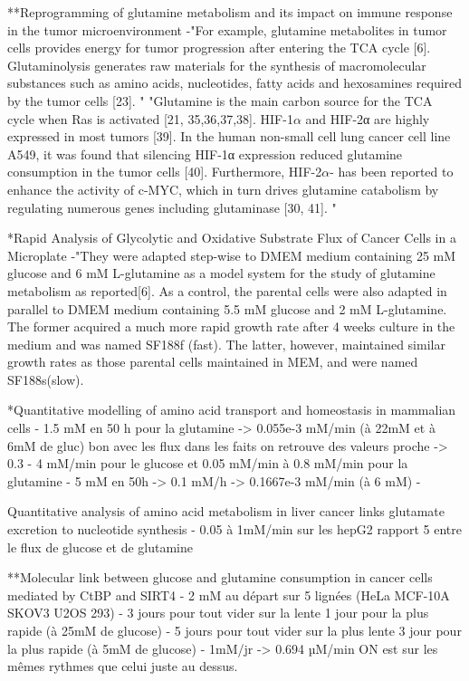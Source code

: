 \documentclass[11pt,a4paper]{article}
\begin{document}
**Reprogramming of glutamine metabolism and its impact on immune response in the tumor microenvironment
-"For example, glutamine metabolites in tumor cells provides energy for tumor progression after entering the TCA cycle [6]. Glutaminolysis generates raw materials for the synthesis of macromolecular substances such as amino acids, nucleotides, fatty acids and hexosamines required by the tumor cells [23]. "
"Glutamine is the main carbon source for the TCA cycle when Ras is activated [21, 35,36,37,38]. HIF-1$\alpha$ and HIF-2α are highly expressed in most tumors [39]. In the human non-small cell lung cancer cell line A549, it was found that silencing HIF-1α expression reduced glutamine consumption in the tumor cells [40]. Furthermore, HIF-2$\alpha$- has been reported to enhance the activity of c-MYC, which in turn drives glutamine catabolism by regulating numerous genes including glutaminase [30, 41]. "


*Rapid Analysis of Glycolytic and Oxidative Substrate Flux
of Cancer Cells in a Microplate
-"They were adapted step-wise to DMEM medium containing 25 mM glucose and 6 mM L-glutamine as a model system for the study of glutamine metabolism as reported[6]. As a control, the parental cells were also adapted in parallel to
DMEM medium containing 5.5 mM glucose and 2 mM L-glutamine. The former acquired a much more rapid growth rate after 4 weeks culture in the medium and was named SF188f (fast). The latter, however, maintained similar growth rates as those parental cells maintained in MEM, and were named SF188s(slow).

*Quantitative modelling of amino acid transport and homeostasis in mammalian cells
- 1.5 mM en 50 h pour la glutamine -> 0.055e-3 mM/min (à 22mM et à 6mM de gluc) bon avec les flux dans les faits on retrouve des valeurs proche -> 0.3 - 4 mM/min pour le glucose et 0.05 mM/min à 0.8 mM/min pour la glutamine
- 5 mM en 50h -> 0.1 mM/h  -> 0.1667e-3 mM/min  (à 6 mM)
-

Quantitative analysis of amino acid metabolism in liver cancer links glutamate excretion to nucleotide synthesis
- 0.05 à 1mM/min sur les hepG2 rapport 5 entre le flux de glucose et de glutamine

**Molecular link between glucose and glutamine consumption in cancer cells mediated by CtBP and SIRT4
- 2 mM au départ sur 5 lignées (HeLa MCF-10A SKOV3 U2OS 293)
- 3 jours pour tout vider sur la lente 1 jour pour la plus rapide (à 25mM de glucose)
- 5 jours pour tout vider sur la plus lente 3 jour pour la plus rapide (à 5mM de glucose)
- 1mM/jr -> 0.694 µM/min
ON est sur les mêmes rythmes que celui juste au dessus.
\end{document}
